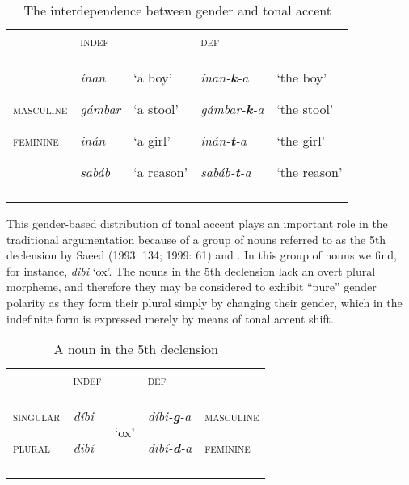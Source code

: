 \documentclass[output=paper]{langsci/langscibook}
\begin{document}
\begin{table}
\caption{The interdependence between gender and tonal accent}
\label{tab:3}

\begin{tabularx}{\textwidth}{XXXXX} & {\textsc{indef}} &  & {\textsc{def}} & \\
\lsptoprule
{\textsc{masculine}}

{\textsc{feminine}} & {\textit{ínan}}

{\textit{gámbar}}

{\textit{inán}}

{\textit{sabáb}} & {‘a boy’}

{‘a stool’}

{‘a girl’}

{‘a reason’} & {\textit{ínan-}\textbf{\textit{k}}\textit{{}-a}}

{\textit{gámbar-}\textbf{\textit{k}}\textit{{}-a}}

{\textit{inán-}\textbf{\textit{t}}\textit{{}-a}}

{\textit{sabáb-}\textbf{\textit{t}}\textit{{}-a}} & {‘the boy’}

{‘the stool’}

{‘the girl’}

{‘the reason’}\\
\lspbottomrule
\end{tabularx}

\end{table} 


This gender-based distribution of tonal accent plays an important role in the traditional argumentation because of a group of nouns referred to as the 5th declension by Saeed (1993: 134; 1999: 61) and \citet[48]{Orwin1995}. In this group of nouns we find, for instance, \textit{dibi} ‘ox’. The nouns in the 5th declension lack an overt plural morpheme, and therefore they may be considered to exhibit “pure” gender polarity as they form their plural simply by changing their gender, which in the indefinite form is expressed merely by means of tonal accent shift.
 
\begin{table}
\caption{A noun in the 5th declension}
\label{tab:4}

\begin{tabularx}{\textwidth}{XXXXX} & {\textsc{indef}} &  & {\textsc{def}} & \\
\lsptoprule
{\textsc{singular}}

{\textsc{plural}} & {\textit{díbi}}

{\textit{dibí}} & {‘ox’} & {\textit{díbi-}\textbf{\textit{g}}\textit{{}-a}}

{\textit{dibí-}\textbf{\textit{d}}\textit{{}-a}} & {\textsc{masculine}}

{\textsc{feminine}}\\
\lspbottomrule
\end{tabularx}

\end{table} 
\end{document}
